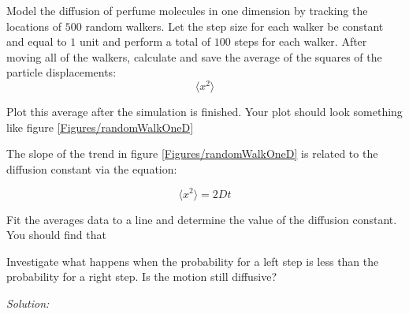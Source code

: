 \begin{enumerate}
  \probtwo Model the diffusion of perfume molecules in one dimension
  by tracking the locations of $500$ random walkers.  Let the step
  size for each walker be constant and equal to $1$ unit and perform a
  total of $100$ steps for each walker. After moving all of the
  walkers, calculate and save the average of the squares of the
  particle displacements:
\begin{equation}
\langle x^2 \rangle
\end{equation}

Plot this average after the simulation is finished.  Your plot should
look something like figure \ref{Figures/randomWalkOneD}

\subprob The slope of the trend in figure \ref{Figures/randomWalkOneD}
is related to the diffusion constant via the equation:

\begin{equation}
\langle x^2 \rangle = 2 D t
\end{equation}

Fit the averages data to a line and determine the value of the
diffusion constant.  You should find that 

\subprob Investigate what happens when the probability for a left step
is less than the probability for a right step.  Is the motion still
diffusive?

\end{enumerate}
\ifsolutions
\textit{Solution:}\\
